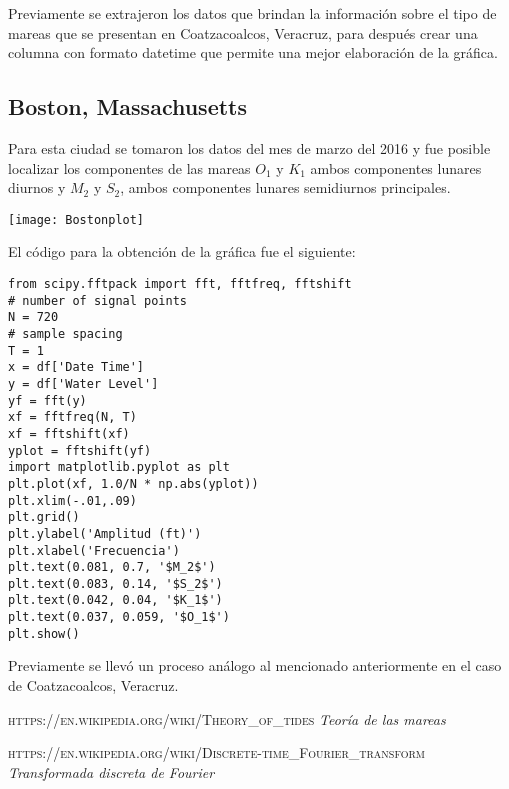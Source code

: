 \documentclass[12pt]{article}
\begin{document}
Previamente se extrajeron los datos que brindan la información sobre el tipo de mareas que se presentan en Coatzacoalcos, Veracruz, para después crear una columna con formato datetime que permite una mejor elaboración de la gráfica. 
 
\newpage
\subsection{Boston, Massachusetts}

Para esta ciudad se tomaron los datos del mes de marzo del 2016 y fue posible localizar los componentes de las mareas $O_1$ y $K_1$ ambos componentes lunares diurnos y $M_2$ y $S_2$, ambos componentes lunares semidiurnos principales.\\


	\begin{center}
	\texttt{[image: Bostonplot]}
	\end{center}
    
El código para la obtención de la gráfica fue el siguiente:

\begin{verbatim}
from scipy.fftpack import fft, fftfreq, fftshift
# number of signal points
N = 720
# sample spacing
T = 1
x = df['Date Time']
y = df['Water Level']
yf = fft(y)
xf = fftfreq(N, T)
xf = fftshift(xf)
yplot = fftshift(yf)
import matplotlib.pyplot as plt
plt.plot(xf, 1.0/N * np.abs(yplot))
plt.xlim(-.01,.09)
plt.grid()
plt.ylabel('Amplitud (ft)')
plt.xlabel('Frecuencia')
plt.text(0.081, 0.7, '$M_2$')
plt.text(0.083, 0.14, '$S_2$')
plt.text(0.042, 0.04, '$K_1$')
plt.text(0.037, 0.059, '$O_1$')
plt.show()
\end{verbatim}

Previamente se llevó un proceso análogo al mencionado anteriormente en el caso de Coatzacoalcos, Veracruz.
  
  
  
\newpage
\begin{thebibliography}{9}

 \textsc{https://en.wikipedia.org/wiki/Theory\_of\_tides} \textit{Teoría de las mareas}

 \textsc{https://en.wikipedia.org/wiki/Discrete-time\_Fourier\_transform} \textit{Transformada discreta de Fourier}

\end{thebibliography}
\end{document}
